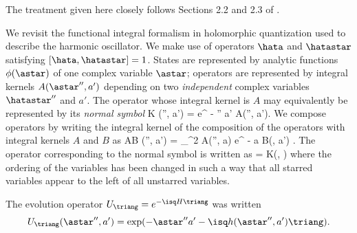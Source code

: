 \maketitle

The treatment given here closely follows Sections 2.2 and 2.3 of 
\cite{FS}.

We revisit the functional integral formalism in 
holomorphic quantization used to describe the harmonic oscillator. 
We make use of operators $\hata$ and $\hatastar$ satisfying
$[\hata, \hatastar] = 1$. States are represented by 
analytic functions $\phi(\astar)$ of one complex variable $\astar$; operators
are represented by integral kernels $A(\astar'', a')$ depending on two 
{\em independent} complex variables $\hatastar''$ and $a'$. 
The operator whose integral kernel is $A$ may equivalently be represented
by its {\em normal symbol}
\beq K (\astar'', a') = e^{ - \astar'' a'} A(\astar'', a'). \eeq
We compose operators by writing the integral kernel of the 
composition of the operators with integral kernels $A$ and $B$ as
\beq 
AB (\astar'', a') = 
\int_{\RR^2} A(\astar'', a) e^{ - \astar a} B(\astar, a') 
. \eeq
The operator corresponding to the normal symbol is written as 
 = K(\hatastar, \hata) \eeq
where the ordering of the variables has been changed 
in such a way that all starred variables appear to the left of all 
unstarred variables. 

The evolution operator $U_\triang = e^{- \isq H \triang}$ was written 
$$U_\triang (\astar'', a' ) = 
\exp (-\astar'' a' - \isq h(\astar'', a') \triang). $$

\nc{\dphi}{\tilde{\phi}} 

